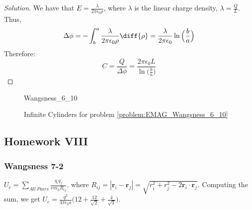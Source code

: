 \documentclass[crop=false,class=article,oneside]{standalone}
\begin{document}
        \begin{proof}[Solution]
            We have that
            $E=\frac{\lambda}{2\pi \epsilon_0 \rho}$,
            where $\lambda$
            is the linear charge density,
            $\lambda=\frac{Q}{L}$.
            Thus,
            \begin{equation*}
                \Delta\phi=-\int_{b}^{a}
                \frac{\lambda}{2\pi\epsilon_0\rho}\diff{\rho}
                =\frac{\lambda}{2\pi\epsilon_{0}}
                \ln\Big(\frac{b}{a}\Big)    
            \end{equation*}
            Therefore:
            \begin{equation*}
                C=\frac{Q}{\Delta\phi}
                =\frac{2\pi\epsilon_{0}L}
                      {\ln\big(\frac{b}{a}\big)}
            \end{equation*}
        \end{proof}
        \begin{figure}[H]
            \centering
            \captionsetup{type=figure}
            {Wangsness_6_10}
            \caption{%
                Infinite Cylinders for problem
                \ref{problem:EMAG_Wangsness_6_10}
            }
            \label{fig:EMAG_Wangsness_6_10}
        \end{figure}
    \subsection{Homework VIII}
        \subsubsection{Wangsness 7-2}
            $U_e=\underset{All\ Pairs}\sum\frac{q_i q_j}{r\pi\epsilon_0 R_{ij}}$,
            where $R_{ij}=|\mathbf{r}_i-\mathbf{r}_j|=\sqrt{r_i^2+r_j^2 -2\mathbf{r}_i\cdot \mathbf{r}_j}$.
            Computing the sum, we get
            $U_e=\frac{q^2}{4\pi\epsilon_0 a}\big(12+\frac{12}{\sqrt{2}}+\frac{4}{\sqrt{3}}\big)$.
\end{document}
